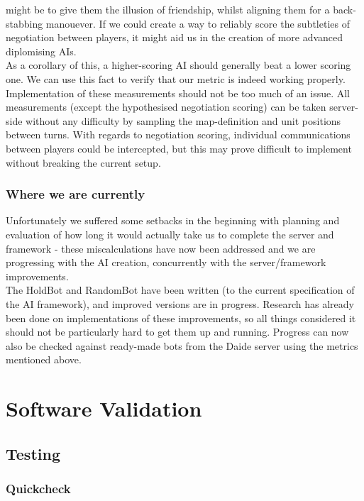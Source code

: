 \documentclass[11pt]{article}
\begin{document}
might be to give them the illusion of friendship, whilst aligning them for a
back-stabbing manouever. If we could create a way to reliably score the 
subtleties of negotiation between players, it might aid us in the creation of
more advanced diplomising AIs.
\\
As a corollary of this, a higher-scoring AI should generally beat a lower 
scoring one. We can use this fact to verify that our metric is indeed working
properly. 
\\
Implementation of these measurements should not be too much of an issue. All 
measurements (except the hypothesised negotiation scoring) can be taken 
server-side without any difficulty by sampling the map-definition and unit 
positions between turns. With regards to negotiation scoring, individual 
communications between players could be intercepted, but this may prove
difficult to implement without breaking the current setup.

\subsubsection{Where we are currently}
Unfortunately we suffered some setbacks in the beginning with planning and 
evaluation of how long it would actually take us to complete the server and
framework - these miscalculations have now been addressed and we are progressing
with the AI creation, concurrently with the server/framework improvements. 
\\
The HoldBot and RandomBot have been written (to the current specification of the
AI framework), and improved versions are in progress. Research has already been 
done on implementations of these improvements, so all things considered it
should not be particularly hard to get them up and running. Progress can now 
also be checked against ready-made bots from the Daide server using the metrics
mentioned above.

\section{Software Validation}

\subsection{Testing}

\subsubsection{Quickcheck}
\end{document}
